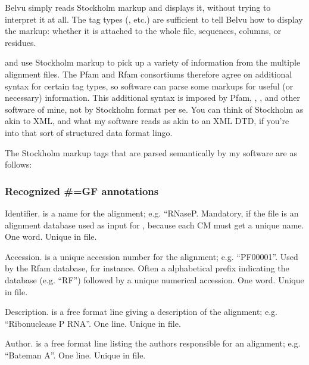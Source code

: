Belvu simply reads Stockholm markup and displays it, without trying to
interpret it at all. The tag types (, etc.) are sufficient
to tell Belvu how to display the markup: whether it is attached to the
whole file, sequences, columns, or residues.

 and  use Stockholm markup to pick
up a variety of information from the multiple alignment files. The
Pfam and Rfam consortiums therefore agree on additional syntax for
certain tag types, so software can parse some markups for useful (or
necessary) information. This additional syntax is imposed by Pfam,
, , and other software of mine, not
by Stockholm format per se. You can think of Stockholm as akin to XML,
and what my software reads as akin to an XML DTD, if you're into that
sort of structured data format lingo.

The Stockholm markup tags that are parsed semantically by my software
are as follows:

\subsubsection{Recognized \#=GF annotations}
\begin{sreitems}{}
\item [\emprog{ID  <s>}] 
	Identifier.  is a name for the alignment;
	e.g. ``RNaseP. Mandatory, if the file is an alignment
        database used as input for , because 
        each CM must get a unique name. One word. Unique in file.

\item [\emprog{AC  <s>}]
	Accession.  is a unique accession number for the
	alignment; e.g. 
	``PF00001''. Used by the Rfam database, for instance. 
	Often a alphabetical prefix indicating the database
	(e.g. ``RF'') followed by a unique numerical accession.
	One word. Unique in file. 
	
\item [\emprog{DE  <s>}]
	Description.  is a free format line giving
	a description of the alignment; e.g.
	``Ribonuclease P RNA''. One line. Unique in file.

\item [\emprog{AU  <s>}]
	Author.  is a free format line listing the 
	authors responsible for an alignment; e.g. 
	``Bateman A''. One line. Unique in file.
\end{sreitems}

